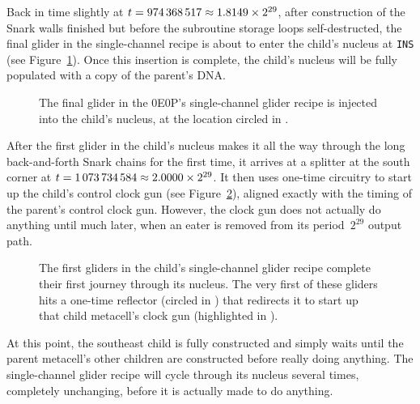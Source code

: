 Back in time slightly at $t = 974{\,}368{\,}517 \approx 1.8149 \times 2^{29}$, after construction of the Snark walls finished but before the subroutine storage loops self-destructed, the final glider in the single-channel recipe is about to enter the child's nucleus at \texttt{INS} (see Figure~\ref{fig:0e0p_timeline_974368517}). Once this insertion is complete, the child's nucleus will be fully populated with a copy of the parent's DNA.

\begin{figure}[!htb]
	\centering
	\caption{The final glider in the 0E0P's single-channel glider recipe is injected into the child's nucleus, at the location circled in .}
	\label{fig:0e0p_timeline_974368517}
\end{figure}

After the first glider in the child's nucleus makes it all the way through the long back-and-forth Snark chains for the first time, it arrives at a splitter at the south corner at $t = 1{\,}073{\,}734{\,}584 \approx 2.0000 \times 2^{29}$. It then uses one-time circuitry to start up the child's control clock gun (see Figure~\ref{fig:0e0p_timeline_1073734584}), aligned exactly with the timing of the parent's control clock gun. However, the clock gun does not actually do anything until much later, when an eater is removed from its period~$2^{29}$ output path.

\begin{figure}[!htb]
	\centering
	\caption{The first gliders in the child's single-channel glider recipe complete their first journey through its nucleus. The very first of these gliders hits a one-time reflector (circled in ) that redirects it to start up that child metacell's clock gun (highlighted in ).}
	\label{fig:0e0p_timeline_1073734584}
\end{figure}

At this point, the southeast child is fully constructed and simply waits until the parent metacell's other children are constructed before really doing anything. The single-channel glider recipe will cycle through its nucleus several times, completely unchanging, before it is actually made to do anything.


